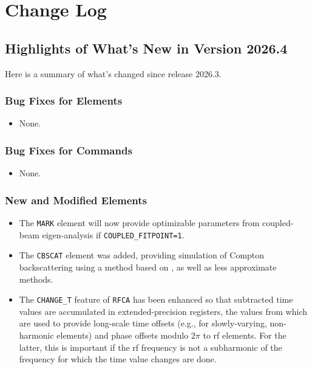 \documentclass[11pt]{article}
\begin{document}
\newpage

\section{Change Log\label{sect:changeLog}}

\subsection{Highlights of What's New in Version 2026.4}

Here is a summary of what's changed since release 2026.3.

\subsubsection{Bug Fixes for Elements}

\begin{itemize}
\item None.
\end{itemize}

\subsubsection{Bug Fixes for Commands}
\begin{itemize}
\item None.
\end{itemize}

\subsubsection{New and Modified Elements}
\begin{itemize}
\item The \verb|MARK| element will now provide optimizable parameters from coupled-beam eigen-analysis\cite{Wolski-PRSTAB9-024001}
  if \verb|COUPLED_FITPOINT=1|.
\item The \verb|CBSCAT| element was added, providing simulation of Compton backscattering using a method based on \cite{PhysRevAccelBeams.22.040702},
   as well as less approximate methods.
\item The \verb|CHANGE_T| feature of \verb|RFCA| has been enhanced so that subtracted time values are accumulated in extended-precision registers,
  the values from which are used to provide long-scale time offsets (e.g., for slowly-varying, non-harmonic elements) and phase offsets modulo
  $2\pi$ to rf elements. For the latter, this is important if the rf frequency is not a subharmonic of the frequency for which the time value
  changes are done.
\end{itemize}
\end{document}
